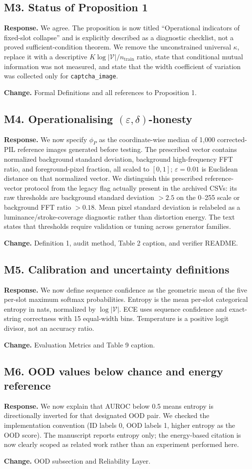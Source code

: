\documentclass[11pt]{article}
\newcommand{\response}[1]{\par\noindent\textbf{Response.} #1\par}
\newcommand{\change}[1]{\par\noindent\textbf{Change.} #1\par}
\begin{document}
\subsection*{M3. Status of Proposition 1}
\response{We agree. The proposition is now titled ``Operational indicators of fixed-slot collapse'' and is explicitly described as a diagnostic checklist, not a proved sufficient-condition theorem. We remove the unconstrained universal $\kappa$, replace it with a descriptive $K\log|\mathcal V|/n_{\mathrm{train}}$ ratio, state that conditional mutual information was not measured, and state that the width coefficient of variation was collected only for \texttt{captcha\_image}.}
\change{Formal Definitions and all references to Proposition 1.}

\subsection*{M4. Operationalising $(\varepsilon,\delta)$-honesty}
\response{We now specify $\phi_P$ as the coordinate-wise median of 1,000 corrected-PIL reference images generated before testing. The prescribed vector contains normalized background standard deviation, background high-frequency FFT ratio, and foreground-pixel fraction, all scaled to $[0,1]$; $\varepsilon=0.01$ is Euclidean distance on that normalized vector. We distinguish this prescribed reference-vector protocol from the legacy flag actually present in the archived CSVs: its raw thresholds are background standard deviation $>2.5$ on the 0--255 scale or background FFT ratio $>0.18$. Mean pixel standard deviation is relabeled as a luminance/stroke-coverage diagnostic rather than distortion energy. The text states that thresholds require validation or tuning across generator families.}
\change{Definition 1, audit method, Table 2 caption, and verifier README.}

\subsection*{M5. Calibration and uncertainty definitions}
\response{We now define sequence confidence as the geometric mean of the five per-slot maximum softmax probabilities. Entropy is the mean per-slot categorical entropy in nats, normalized by $\log|\mathcal V|$. ECE uses sequence confidence and exact-string correctness with 15 equal-width bins. Temperature is a positive logit divisor, not an accuracy ratio.}
\change{Evaluation Metrics and Table 9 caption.}

\subsection*{M6. OOD values below chance and energy reference}
\response{We now explain that AUROC below 0.5 means entropy is directionally inverted for that designated OOD pair. We checked the implementation convention (ID labels 0, OOD labels 1, higher entropy as the OOD score). The manuscript reports entropy only; the energy-based citation is now clearly scoped as related work rather than an experiment performed here.}
\change{OOD subsection and Reliability Layer.}
\end{document}
